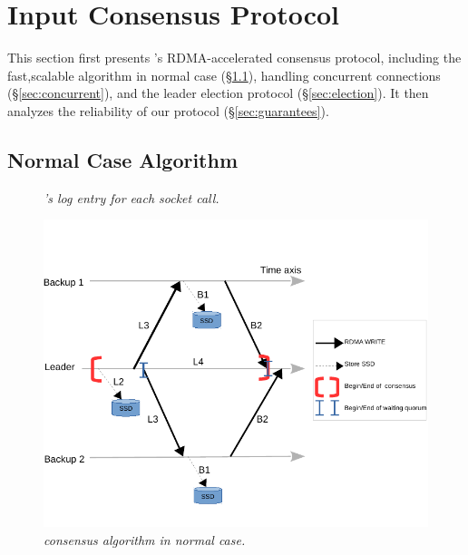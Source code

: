 \section{Input Consensus Protocol} \label{sec:input}

This section first presents \xxx's RDMA-accelerated \paxos consensus protocol, 
including the fast,scalable algorithm in normal case (\S\ref{sec:normal}), 
handling concurrent connections (\S\ref{sec:concurrent}), and the leader 
election protocol (\S\ref{sec:election}). It then analyzes the reliability of 
our protocol (\S\ref{sec:guarantees}).

\subsection{Normal Case Algorithm} \label{sec:normal}

\begin{figure}[t]
\centering
\begin{minipage}{.5\textwidth}
\end{minipage}
\vspace{-.1in}
\caption{{\em \xxx's log entry for each socket call.}} \label{fig:logentry}
\vspace{-.05in}
\end{figure}

\begin{figure}[t]
\centering
\vspace{-0.15in}
\includegraphics[width=.48\textwidth]{figures/consensus}
\vspace{-.4in}
\caption{{\em \xxx consensus algorithm in normal case.}} \label{fig:consensus}
\vspace{-.05in}
\end{figure}



